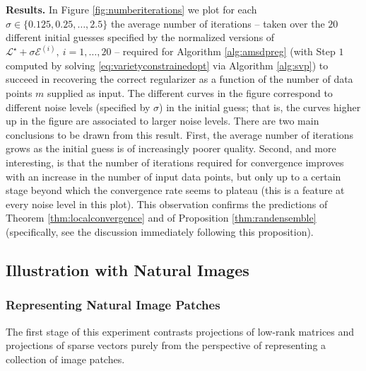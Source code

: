 \documentclass[11pt,letterpaper]{article}
\renewcommand{\L}{\mathcal{L}}
\begin{document}
\textbf{Results.} In Figure \ref{fig:numberiterations} we plot for each $\sigma \in \{0.125,0.25,\dots,2.5\}$ the average number of iterations -- taken over the $20$ different initial guesses specified by the normalized versions of $\L^\star + \sigma \mathcal{E}^{(i)}, ~ i=1,\dots,20$ -- required for Algorithm \ref{alg:amsdpreg} (with Step $1$ computed by solving \eqref{eq:varietyconstrainedopt} via Algorithm \ref{alg:svp}) to succeed in recovering the correct regularizer as a function of the number of data points $m$ supplied as input.  The different curves in the figure correspond to different noise levels (specified by $\sigma$) in the initial guess; that is, the curves higher up in the figure are associated to larger noise levels.  There are two main conclusions to be drawn from this result.  First, the average number of iterations grows as the initial guess is of increasingly poorer quality.  Second, and more interesting, is that the number of iterations required for convergence improves with an increase in the number of input data points, but only up to a certain stage beyond which the convergence rate seems to plateau (this is a feature at every noise level in this plot).  This observation confirms the predictions of Theorem \ref{thm:localconvergence} and of Proposition \ref{thm:randensemble} (specifically, see the discussion immediately following this proposition).


\subsection{Illustration with Natural Images} \label{sec:numexp_raw}

\subsubsection{Representing Natural Image Patches} \label{sec:numexp_raw_rep}


The first stage of this experiment contrasts projections of low-rank matrices and projections of sparse vectors purely from the perspective of representing a collection of image patches.
\end{document}
